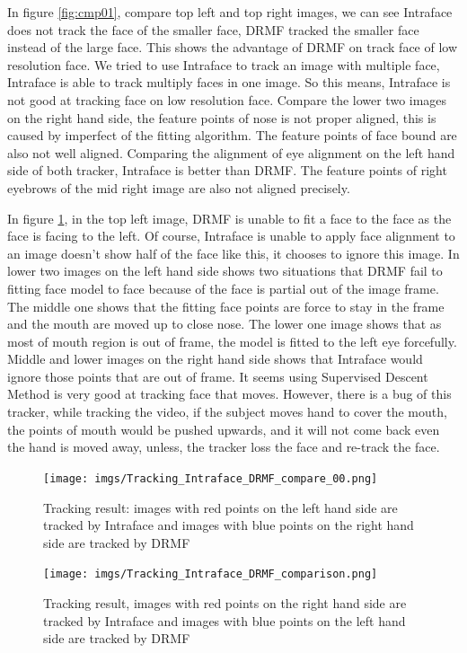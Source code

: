 In figure \ref{fig:cmp01}, compare top left and top right images, we can see Intraface does not track the face of the smaller face, DRMF tracked the smaller face instead of the large face. This shows the advantage of DRMF on track face of low resolution face. We tried to use Intraface to track an image with multiple face, Intraface is able to track multiply faces in one image. So this means, Intraface is not good at tracking face on low resolution face. Compare the lower two images on the right hand side, the feature points of nose is not proper aligned, this is caused by imperfect of the fitting algorithm. The feature points of face bound are also not well aligned. Comparing the alignment of eye alignment on the left hand side of both tracker, Intraface is better than DRMF. The feature points of right eyebrows of the mid right image are also not aligned precisely.

In figure \ref{fig:cmp02}, in the top left image, DRMF is unable to fit a face to the face as the face is facing to the left. Of course, Intraface is unable to apply face alignment to an image doesn't show half of the face like this, it chooses to ignore this image. In lower two images on the left hand side shows two situations that DRMF fail to fitting face model to face because of the face is partial out of the image frame. The middle one shows that the fitting face points are force to stay in the frame and the mouth are moved up to close nose. The lower one image shows that as most of mouth region is out of frame, the model is fitted to the left eye forcefully. Middle and lower images on the right hand side shows that Intraface would ignore those points that are out of frame. It seems using Supervised Descent Method is very good at tracking face that moves. However, there is a bug of this tracker, while tracking the video, if the subject moves hand to cover the mouth, the points of mouth would be pushed upwards, and it will not come back even the hand is moved away, unless, the tracker loss the face and re-track the face.
\begin{figure}
\centering
\texttt{[image: imgs/Tracking\_Intraface\_DRMF\_compare\_00.png]}
\caption{Tracking result: images with red points on the left hand side are tracked by Intraface and images with blue points on the right hand side are tracked by DRMF}
\label{fig:cmp01}
\texttt{[image: imgs/Tracking\_Intraface\_DRMF\_comparison.png]}
\caption{Tracking result, images with red points on the right hand side are tracked by Intraface and images with blue points on the left hand side are tracked by DRMF}
\label{fig:cmp02}
\end{figure}
\newpage
